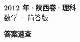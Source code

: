 \documentclass[zihao=-4, a4paper]{ctexart}
\begin{document}
\begin{center}
  {\Large\bfseries 2012 年·陕西卷·理科}\\[4pt]
  {\large 数学 · 简答版}
\end{center}
\medskip
{}

\clearpage
{}
\begin{center}{\Large\bfseries 答案速查}\end{center}
\medskip

\end{document}
